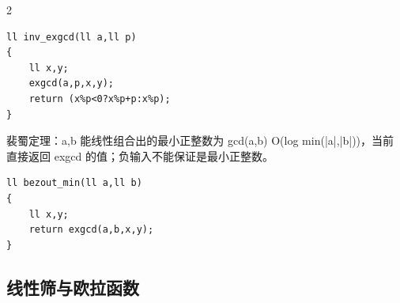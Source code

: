 \documentclass[UTF8,fontset=fandol,a4paper,twoside]{ctexart}
\newcommand{\note}[1]{{\fontsize{10}{12}\selectfont #1\par}}
\begin{document}
\begin{multicols}{2}
\begin{lstlisting}
ll inv_exgcd(ll a,ll p)
{
    ll x,y;
    exgcd(a,p,x,y);
    return (x%p<0?x%p+p:x%p);
}
\end{lstlisting}
\note{裴蜀定理：a,\allowbreak{}b 能线性组合出的最小正整数为 gcd(\allowbreak{}a,\allowbreak{}b)\allowbreak{} O(\allowbreak{}log min(\allowbreak{}|a|,\allowbreak{}|b|)\allowbreak{})\allowbreak{}，当前直接返回 exgcd 的值；负输入不能保证是最小正整数。}
\begin{lstlisting}
ll bezout_min(ll a,ll b)
{
    ll x,y;
    return exgcd(a,b,x,y);
}
\end{lstlisting}
\subsection{线性筛与欧拉函数}


\end{multicols}
\end{document}
